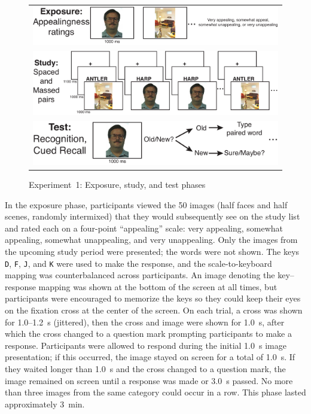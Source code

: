 \begin{figure}
  \centering
  \begin{tabular}{l}
  \includegraphics[width=.8\textwidth]{./figs/exp1/space_example_expo} \\
  \includegraphics[width=.9\textwidth]{./figs/exp1/space_example_study_fix} \\
  \includegraphics[width=.7\textwidth]{./figs/exp1/space_example_test}
  \end{tabular}
  \caption{Experiment~1: Exposure, study, and test phases}
  \label{fig:space_exp}
\end{figure}

In the exposure phase, participants viewed the 50 images (half faces and half scenes, randomly intermixed) that they would subsequently see on the study list and rated each on a four-point ``appealing'' scale: very appealing, somewhat appealing, somewhat unappealing, and very unappealing.  Only the images from the upcoming study period were presented; the words were not shown.  The keys {\tt D}, {\tt F}, {\tt J}, and {\tt K} were used to make the response, and the scale-to-keyboard mapping was counterbalanced across participants.  An image denoting the key--response mapping was shown at the bottom of the screen at all times, but participants were encouraged to memorize the keys so they could keep their eyes on the fixation cross at the center of the screen.  On each trial, a cross was shown for 1.0--1.2~s (jittered), then the cross and image were shown for 1.0~s, after which the cross changed to a question mark prompting participants to make a response.  Participants were allowed to respond during the initial 1.0~s image presentation; if this occurred, the image stayed on screen for a total of 1.0~s.  If they waited longer than 1.0~s and the cross changed to a question mark, the image remained on screen until a response was made or 3.0~s passed.  No more than three images from the same category could occur in a row. This phase lasted approximately 3~min.

